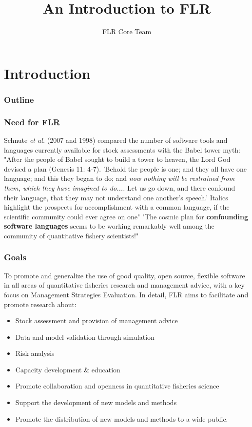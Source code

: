\documentclass{beamer}%
\title[Introduction to FLR]{An Introduction to FLR}
\author{FLR Core Team}
\begin{document}
\section{Introduction}

\begin{frame}[plain]
\titlepage
\end{frame}

\begin{frame}
\frametitle{Outline}
\tableofcontents[pausesections]
\end{frame}


\begin{frame}
  \frametitle{Need for FLR}

Schnute \emph{et al.} (2007 and 1998) compared the number of software tools and languages currently available for stock assessments with the Babel tower myth:
\pause\newline\newline
\textrm{{\footnotesize{
"After the people of Babel sought to build a tower to heaven, the Lord God devised a plan (Genesis 11: 4-7). 'Behold the people is one; and they all have one language; and this they began to do; and \emph{now nothing will be restrained from them, which they have imagined to do....} Let us go down, and there confound their language, that they may not understand one another's speech.' Italics highlight the prospects for accomplishment with a common language, if the scientific community could ever agree on one"
\pause\newline\newline
"The cosmic plan for \textbf{confounding software languages} seems to be working remarkably well among the community of quantitative fishery scientists!"
}}}
\end{frame}

\begin{frame}
\frametitle{Goals}

To promote and generalize the use of good quality, open source, flexible software in all areas of quantitative fisheries research and management advice, with a key focus on Management Strategies Evaluation. In detail, FLR aims to facilitate and promote research about:
      \begin{itemize}
	 \item<2-> Stock assessment and provision of management advice
	 \item<3-> Data and model validation through simulation
	 \item<4-> Risk analysis
	 \item<5-> Capacity development \& education
	 \item<6-> Promote collaboration and openness in quantitative fisheries science
	 \item<7-> Support the development of new models and methods
	 \item<8-> Promote the distribution of new models and methods to a wide public.
       \end{itemize}
\end{frame}
\end{document}
